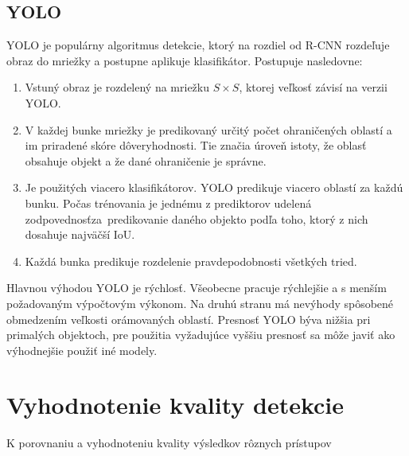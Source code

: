 
    \section{YOLO}

        \ac{YOLO} je populárny algoritmus detekcie, ktorý na rozdiel od \ac{R-CNN} rozdeľuje obraz do mriežky a postupne aplikuje klasifikátor. Postupuje nasledovne:

        \begin{enumerate}
            \item Vstuný obraz je rozdelený na mriežku \(S \times S\), ktorej veľkosť závisí na verzii \ac{YOLO}.
            \item V každej bunke mriežky je predikovaný určitý počet ohraničených oblastí a im priradené skóre dôveryhodnosti. Tie značia úroveň istoty, že oblasť obsahuje objekt a že dané ohraničenie je správne.
            \item Je použitých viacero klasifikátorov. \ac{YOLO} predikuje viacero oblastí za každú bunku. Počas trénovania je jednému z prediktorov udelená zodpovednosť\linebreak za~predikovanie daného objekto podľa toho, ktorý z nich dosahuje najväčší \ac{IoU}.
            \item Každá bunka predikuje rozdelenie pravdepodobnosti všetkých tried.
        \end{enumerate}

        Hlavnou výhodou \ac{YOLO} je rýchlosť. Všeobecne pracuje rýchlejšie a s menším požadovaným výpočtovým výkonom. Na druhú stranu má nevýhody spôsobené obmedzením veľkosti orámovaných oblastí. Presnosť \ac{YOLO} býva nižšia pri primalých objektoch, pre použitia vyžadujúce vyššiu presnosť sa môže javiť ako výhodnejšie použiť iné modely.

\chapter{Vyhodnotenie kvality detekcie}
    K porovnaniu a vyhodnoteniu kvality výsledkov rôznych prístupov 
